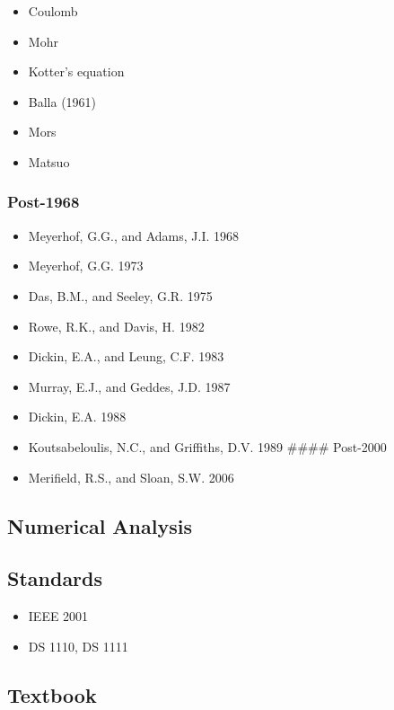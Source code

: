 \documentclass[a4paper, nobind]{templates/ociamthesis}
\providecommand{\tightlist}{%
  \setlength{\itemsep}{0pt}\setlength{\parskip}{0pt}}
\begin{document}
\begin{itemize}
\tightlist
\item
  Coulomb
\item
  Mohr
\item
  Kotter's equation
\item
  Balla (1961)
\item
  Mors
\item
  Matsuo
\end{itemize}

\hypertarget{post-1968}{%
\subsubsection{Post-1968}\label{post-1968}}

\begin{itemize}
\tightlist
\item
  Meyerhof, G.G., and Adams, J.I. 1968
\item
  Meyerhof, G.G. 1973
\item
  Das, B.M., and Seeley, G.R. 1975
\item
  Rowe, R.K., and Davis, H. 1982
\item
  Dickin, E.A., and Leung, C.F. 1983
\item
  Murray, E.J., and Geddes, J.D. 1987
\item
  Dickin, E.A. 1988
\item
  Koutsabeloulis, N.C., and Griffiths, D.V. 1989
  \#\#\#\# Post-2000
\item
  Merifield, R.S., and Sloan, S.W. 2006
\end{itemize}

\hypertarget{numerical-analysis}{%
\subsection{Numerical Analysis}\label{numerical-analysis}}

\hypertarget{standards}{%
\subsection{Standards}\label{standards}}

\begin{itemize}
\tightlist
\item
  IEEE 2001
\item
  DS 1110, DS 1111
\end{itemize}

\hypertarget{textbook}{%
\subsection{Textbook}\label{textbook}}
\end{document}
